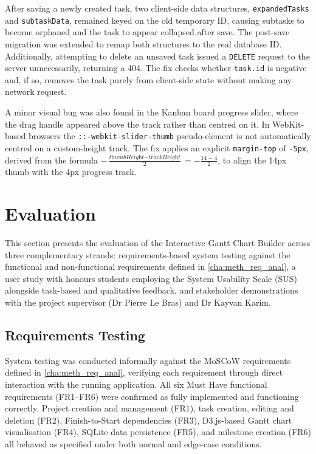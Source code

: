 \documentclass[12pt,nonacm,acmlarge,titlepage,screen]{acmart}
\begin{document}
After saving a newly created task, two client-side data structures, 
\texttt{expandedTasks} and \texttt{subtaskData}, remained keyed on the old temporary 
ID, causing subtasks to become orphaned and the task to appear collapsed after save. 
The post-save migration was extended to remap both structures to the real database 
ID. Additionally, attempting to delete an unsaved task issued a \texttt{DELETE} 
request to the server unnecessarily, returning a 404. The fix checks whether 
\texttt{task.id} is negative and, if so, removes the task purely from client-side 
state without making any network request.

A minor visual bug was also found in the Kanban board progress slider, where the 
drag handle appeared above the track rather than centred on it. In WebKit-based 
browsers the \texttt{::-webkit-slider-thumb} pseudo-element is not automatically 
centred on a custom-height track. The fix applies an explicit \texttt{margin-top} 
of \texttt{-5px}, derived from the formula 
$-\frac{\textit{thumbHeight} - \textit{trackHeight}}{2} = -\frac{14 - 4}{2}$, 
to align the 14px thumb with the 4px progress track.


\section{Evaluation} \label{cha:eval}

This section presents the evaluation of the Interactive Gantt Chart Builder across
three complementary strands: requirements-based system testing against the
functional and non-functional requirements defined in \cref{cha:meth_req_anal}, a user study
with honours students employing the System Usability Scale (SUS) \cite{brooke_1995}
alongside task-based and qualitative feedback, and stakeholder demonstrations with
the project supervisor (Dr Pierre Le Bras) and Dr Kayvan Karim.

\subsection{Requirements Testing} \label{sec:eval_req}

System testing was conducted informally against the MoSCoW requirements defined in
\cref{cha:meth_req_anal}, verifying each requirement through direct interaction with the running
application. All six Must Have functional requirements (FR1--FR6) were confirmed as
fully implemented and functioning correctly. Project creation and management (FR1),
task creation, editing and deletion (FR2), Finish-to-Start dependencies (FR3),
D3.js-based Gantt chart visualisation (FR4), SQLite data persistence (FR5), and
milestone creation (FR6) all behaved as specified under both normal and edge-case
conditions.
\end{document}
